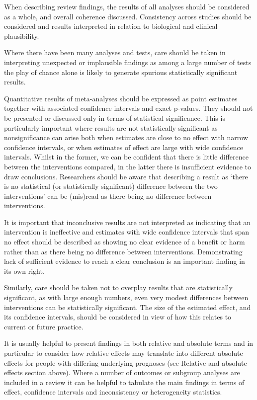 \documentclass[
  11pt,
  a4paper,
  DIV=11,
  numbers=noendperiod]{scrreprt}
\begin{document}
When describing review findings, the results of all analyses should be
considered as a whole, and overall coherence discussed. Consistency
across studies should be considered and results interpreted in relation
to biological and clinical plausibility.

Where there have been many analyses and tests, care should be taken in
interpreting unexpected or implausible findings as among a large number
of tests the play of chance alone is likely to generate spurious
statistically significant results.

Quantitative results of meta-analyses should be expressed as point
estimates together with associated confidence intervals and exact
p-values. They should not be presented or discussed only in terms of
statistical significance. This is particularly important where results
are not statistically significant as nonsignificance can arise both when
estimates are close to no effect with narrow confidence intervals, or
when estimates of effect are large with wide confidence intervals.
Whilst in the former, we can be confident that there is little
difference between the interventions compared, in the latter there is
insufficient evidence to draw conclusions. Researchers should be aware
that describing a result as `there is no statistical (or statistically
significant) difference between the two interventions' can be (mis)read
as there being no difference between interventions.

It is important that inconclusive results are not interpreted as
indicating that an intervention is ineffective and estimates with wide
confidence intervals that span no effect should be described as showing
no clear evidence of a benefit or harm rather than as there being no
difference between interventions. Demonstrating lack of sufficient
evidence to reach a clear conclusion is an important finding in its own
right.

Similarly, care should be taken not to overplay results that are
statistically significant, as with large enough numbers, even very
modest differences between interventions can be statistically
significant. The size of the estimated effect, and its confidence
intervals, should be considered in view of how this relates to current
or future practice.

It is usually helpful to present findings in both relative and absolute
terms and in particular to consider how relative effects may translate
into different absolute effects for people with differing underlying
prognoses (see Relative and absolute effects section above). Where a
number of outcomes or subgroup analyses are included in a review it can
be helpful to tabulate the main findings in terms of effect, confidence
intervals and inconsistency or heterogeneity statistics.
\end{document}
